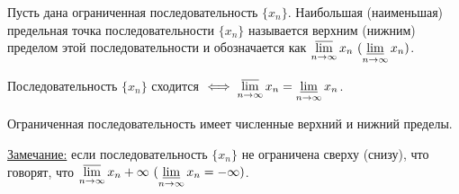 \documentclass{article}
\begin{document}
\begin{definition}
    Пусть дана ограниченная последовательность \(\{x_n\}\).
    Наибольшая (наименьшая) предельная точка последовательности \(\{x_n\}\) называется верхним (нижним) пределом этой последовательности и обозначается как 
    \(\varlimsup\limits_{n \to \infty} x_n\ (\varliminf\limits_{n \to \infty} x_n)\). 
\end{definition}

\begin{claim}
    Последовательность \(\{x_n\}\) сходится \(\iff \varlimsup\limits_{n \to \infty} x_n = \varliminf\limits_{n \to \infty} x_n\).  
\end{claim}

\begin{theorem}
    Ограниченная последовательность имеет численные верхний и нижний пределы.
\end{theorem}
\noindent \underline{Замечание:} если последовательность \(\{x_n\}\)  не ограничена сверху (снизу), что говорят, что
\(\varlimsup\limits_{n \to \infty} x_n +\infty\ (\varliminf\limits_{n \to \infty} x_n = -\infty)\). 
\end{document}
